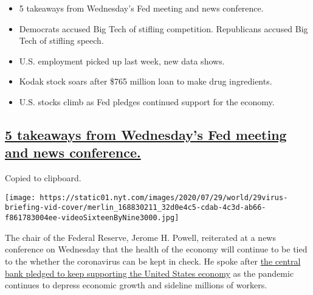 \begin{itemize}
\item
  \protect\hyperlink{5-takeaways-from-wednesdays-fed-meeting-and-news-conference}{}

  5 takeaways from Wednesday's Fed meeting and news conference.
\item
  \protect\hyperlink{democrats-accused-big-tech-of-stifling-competition-republicans-accused-big-tech-of-stifling-speech}{}

  Democrats accused Big Tech of stifling competition. Republicans
  accused Big Tech of stifling speech.
\item
  \protect\hyperlink{us-employment-picked-up-last-week-new-data-shows}{}

  U.S. employment picked up last week, new data shows.
\item
  \protect\hyperlink{kodak-stock-soars-after-765-million-loan-to-make-drug-ingredients}{}

  Kodak stock soars after \$765 million loan to make drug ingredients.
\item
  \protect\hyperlink{us-stocks-climb-as-fed-pledges-continued-support-for-the-economy}{}

  U.S. stocks climb as Fed pledges continued support for the economy.
\end{itemize}

\hypertarget{5-takeaways-from-wednesdays-fed-meeting-and-news-conference}{%
\subsection{\texorpdfstring{\protect\hyperlink{5-takeaways-from-wednesdays-fed-meeting-and-news-conference}{5
takeaways from Wednesday's Fed meeting and news
conference.}}{5 takeaways from Wednesday's Fed meeting and news conference.}}\label{5-takeaways-from-wednesdays-fed-meeting-and-news-conference}}

Copied to clipboard.

\texttt{[image: https://static01.nyt.com/images/2020/07/29/world/29virus-briefing-vid-cover/merlin\_168830211\_32d0e4c5-cdab-4c3d-ab66-f861783004ee-videoSixteenByNine3000.jpg]}

The chair of the Federal Reserve, Jerome H. Powell, reiterated at a news
conference on Wednesday that the health of the economy will continue to
be tied to the whether the coronavirus can be kept in check. He spoke
after
\href{https://www.nytimes.com/2020/07/29/business/economy/federal-reserve-meeting-interest-rates.html}{the
central bank pledged to keep supporting the United States economy} as
the pandemic continues to depress economic growth and sideline millions
of workers.

